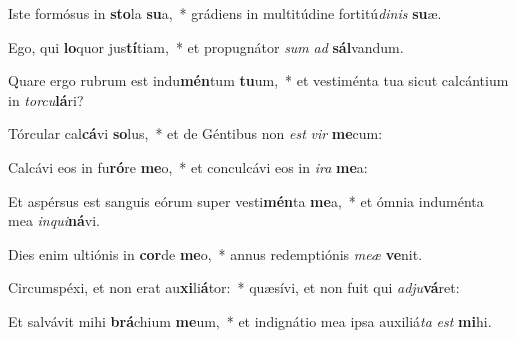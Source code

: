 \item Iste formósus in \textbf{sto}la \textbf{su}a,~* grádiens in multitúdine fortitú\textit{di}\textit{nis} \textbf{su}æ.
\item Ego, qui \textbf{lo}quor jus\textbf{tí}tiam,~* et propugnátor \textit{sum} \textit{ad} \textbf{sál}vandum.
\item Quare ergo rubrum est indu\textbf{mén}tum \textbf{tu}um,~* et vestiménta tua sicut calcántium in \textit{tor}\textit{cu}\textbf{lá}ri?
\item Tórcular cal\textbf{cá}vi \textbf{so}lus,~* et de Géntibus non \textit{est} \textit{vir} \textbf{me}cum:
\item Calcávi eos in fu\textbf{ró}re \textbf{me}o,~* et conculcávi eos in \textit{i}\textit{ra} \textbf{me}a:
\item Et aspérsus est sanguis eórum super vesti\textbf{mén}ta \textbf{me}a,~* et ómnia induménta mea \textit{in}\textit{qui}\textbf{ná}vi.
\item Dies enim ultiónis in \textbf{cor}de \textbf{me}o,~* annus redemptiónis \textit{me}\textit{æ} \textbf{ve}nit.
\item Circumspéxi, et non erat au\textbf{xi}li\textbf{á}tor:~* quæsívi, et non fuit qui \textit{ad}\textit{ju}\textbf{vá}ret:
\item Et salvávit mihi \textbf{brá}chium \textbf{me}um,~* et indignátio mea ipsa auxiliá\textit{ta} \textit{est} \textbf{mi}hi.
